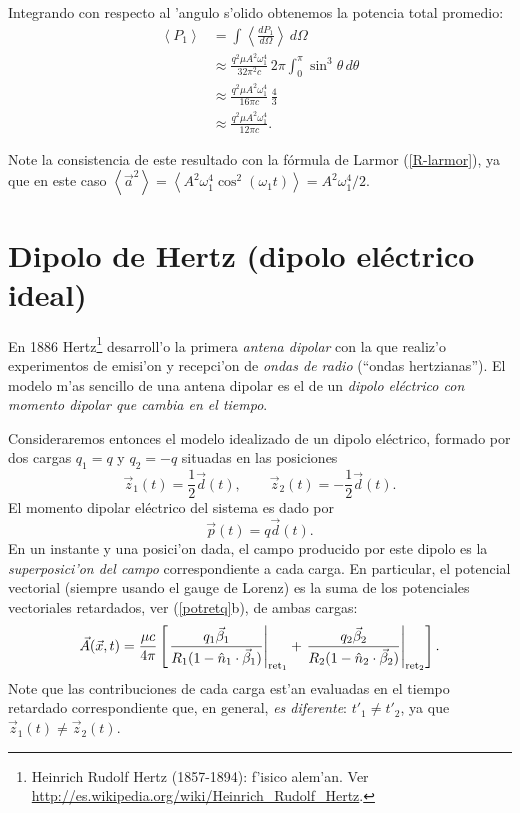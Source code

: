  Integrando con respecto al 'angulo s'olido obtenemos la potencia total promedio:
\begin{align}
\left\langle P_{1}\right\rangle &= \int \left\langle\frac{dP_{1}}{d\Omega}\right\rangle\,d\Omega\\
&\approx \frac{q^2\mu A^2\omega_1^4}{32\pi^2c}\,2\pi\int_{0}^{\pi
}\sin ^{3}\theta\, d\theta   \\
&\approx \frac{q^2\mu A^2\omega_1^4}{16\pi c}\,\frac{4}{3}  \\
&\approx \frac{q^2\mu A^2\omega_1^4}{12\pi c}.
\end{align}

Note la consistencia de este resultado con la fórmula de Larmor (\ref{R-larmor}), ya que en este caso $\left\langle\vec{a}^2\right\rangle=\left\langle A^2\omega_1^4\cos^2(\omega_1t)\right\rangle=A^2\omega_1^4/2$.


\section{Dipolo de Hertz (dipolo eléctrico ideal)}

En 1886 Hertz\footnote{Heinrich Rudolf Hertz (1857-1894): f'isico alem'an. Ver \url{http://es.wikipedia.org/wiki/Heinrich_Rudolf_Hertz}.} desarroll'o la primera \textit{antena dipolar} con la que realiz'o experimentos de emisi'on y recepci'on de \textit{ondas de radio} (``ondas hertzianas''). El modelo m'as sencillo de una antena dipolar es el de un \textit{dipolo eléctrico con momento dipolar que cambia en el tiempo}.

Consideraremos entonces el modelo idealizado de un dipolo eléctrico, formado por dos cargas $q_1=q$ y $q_2=-q$ situadas en las posiciones
\begin{equation}
 \vec{z}_1(t)=\frac{1}{2}\vec{d}(t), \qquad \vec{z}_2(t)=-\frac{1}{2}\vec{d}(t).
\end{equation}
El momento dipolar eléctrico del sistema es dado por
\begin{equation}
 \vec{p}(t)=q\vec{d}(t).
\end{equation}
En un instante y una posici'on dada, el campo producido por este dipolo es la \textit{superposici'on del campo} correspondiente a cada carga. En particular, el potencial vectorial (siempre usando el gauge de Lorenz) es la suma de los potenciales vectoriales retardados, ver (\ref{potretq}b), de ambas cargas:
\begin{equation}
\vec{A}(\vec{x},t)=\frac{\mu c}{4\pi}\left[\left.\frac{q_1\vec{\beta}_1}{R_1(1-\hat{n}_1\cdot\vec{\beta}_1)}\right|_{{\rm ret}_1} +\left.\frac{q_2\vec{\beta}_2}{R_2(1-\hat{n}_2\cdot\vec{\beta}_2)}\right|_{{\rm ret}_2}\right].
\end{equation}
Note que las contribuciones de cada carga est'an evaluadas en el tiempo retardado correspondiente que, en general, \textit{es diferente}: $t'_1\neq t'_2$, ya que $\vec{z}_1(t)\neq\vec{z}_2(t)$.

